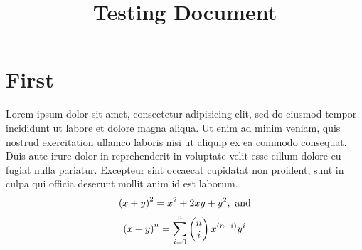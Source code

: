 \documentclass{article}
\title{Testing Document}
\begin{document}
\maketitle
\section{First}
Lorem ipsum dolor sit amet, consectetur adipisicing elit, sed do eiusmod tempor incididunt ut labore et dolore magna aliqua. Ut enim ad minim veniam, quis nostrud exercitation ullamco laboris nisi ut aliquip ex ea commodo consequat. Duis aute irure dolor in reprehenderit in voluptate velit esse cillum dolore eu fugiat nulla pariatur. Excepteur sint occaecat cupidatat non proident, sunt in culpa qui officia deserunt mollit anim id est laborum.
\[ \left( x+y \right)^2 = x^2 + 2xy + y^2, \text{ and} \]
\[ \left( x+y \right)^n = \sum_{i=0}^{n}\left(  \begin{matrix} n \\ i \end{matrix}  \right) x^{\left( n-i \right)} y^i \]
\end{document}
